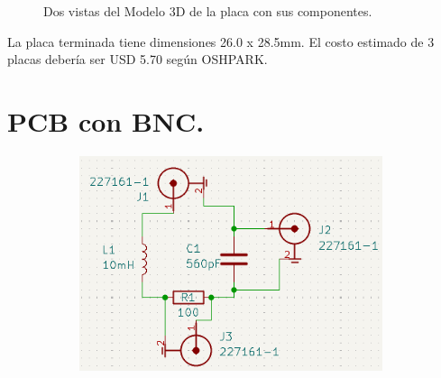 \begin{figure}[!ht]
\begin{minipage}[c]{0.49\textwidth}
\begin{subfigure}{\textwidth}
					\captionsetup{width=0.8\textwidth}
					\subcaption{}
				\end{subfigure}
		\end{minipage}
	\caption{Dos vistas del Modelo 3D de la placa con sus componentes.}
	\label{fig:}
\end{figure}

La placa terminada tiene dimensiones 26.0 x 28.5mm. El costo estimado de 3 placas debería ser USD 5.70 según OSHPARK. %


\section{PCB con BNC.}
\begin{figure}[!ht]
	\begin{minipage}[c]{0.3325\textwidth}
		\begin{subfigure}{\textwidth}
			\centering
			\includegraphics[width=0.978\textwidth]{Figures/02_06_2025/Schematic_BNC}
			\captionsetup{width=0.8\textwidth}
			\subcaption{}
		\end{subfigure}
	\end{minipage}\begin{minipage}[c]{0.332149\textwidth}
		\begin{subfigure}{\textwidth}
			\centering

\end{subfigure}
\end{minipage}
\end{figure}
